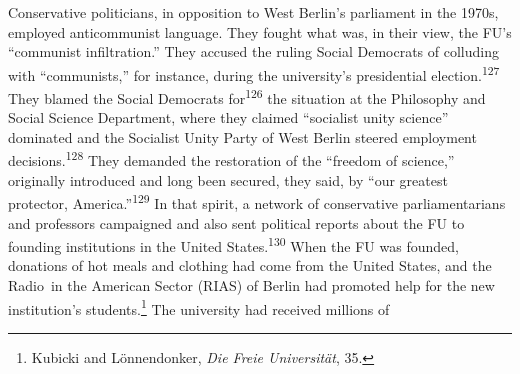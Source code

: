 \documentclass{tufte-handout}
\begin{document}
Conservative politicians, in opposition to West Berlin's parliament in
the 1970s, employed anticommunist language. They fought what was, in
their view, the FU's ``communist infiltration.'' They accused the ruling
Social Democrats of colluding with ``communists,'' for instance, during
the university's presidential election.\textsuperscript{127} They blamed the Social
Democrats for\textsuperscript{126} the situation at the Philosophy and Social Science
Department, where they claimed ``socialist unity science'' dominated and
the Socialist Unity Party of West Berlin steered employment
decisions.\textsuperscript{128} They demanded the restoration of the ``freedom of
science,'' originally introduced and long been secured, they said, by
``our greatest protector, America.''\textsuperscript{129} In that spirit, a network of
conservative parliamentarians and professors campaigned and also sent
political reports about the FU to founding institutions in the United
States.\textsuperscript{130} When the FU was founded, donations of hot
meals and clothing had come from the United States, and the Radio~in
the American Sector (RIAS) of Berlin had promoted help for the new institution's students.\footnote{Kubicki and Lönnendonker, \emph{Die
  Freie Universität}, 35.} The university had received millions of
\end{document}
